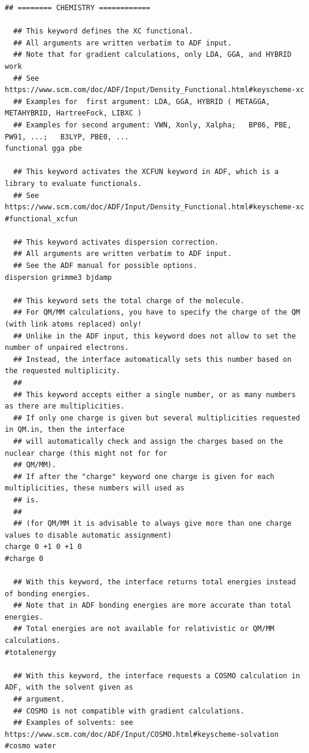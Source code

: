 \documentclass[a4paper,11pt,DIV=15,openany]{scrbook}
\begin{document}
\begin{oframed}
\begin{Verbatim}[commandchars=\\\{\}]
  ## ======== CHEMISTRY ============

  ## This keyword defines the XC functional.
  ## All arguments are written verbatim to ADF input.
  ## Note that for gradient calculations, only LDA, GGA, and HYBRID work
  ## See https://www.scm.com/doc/ADF/Input/Density_Functional.html#keyscheme-xc
  ## Examples for  first argument: LDA, GGA, HYBRID ( METAGGA, METAHYBRID, HartreeFock, LIBXC )
  ## Examples for second argument: VWN, Xonly, Xalpha;   BP86, PBE, PW91, ...;   B3LYP, PBE0, ...
functional gga pbe

  ## This keyword activates the XCFUN keyword in ADF, which is a library to evaluate functionals.
  ## See https://www.scm.com/doc/ADF/Input/Density_Functional.html#keyscheme-xc
#functional_xcfun

  ## This keyword activates dispersion correction.
  ## All arguments are written verbatim to ADF input.
  ## See the ADF manual for possible options.
dispersion grimme3 bjdamp

  ## This keyword sets the total charge of the molecule.
  ## For QM/MM calculations, you have to specify the charge of the QM (with link atoms replaced) only!
  ## Unlike in the ADF input, this keyword does not allow to set the number of unpaired electrons.
  ## Instead, the interface automatically sets this number based on the requested multiplicity.
  ##
  ## This keyword accepts either a single number, or as many numbers as there are multiplicities.
  ## If only one charge is given but several multiplicities requested in QM.in, then the interface
  ## will automatically check and assign the charges based on the nuclear charge (this might not for for 
  ## QM/MM).
  ## If after the "charge" keyword one charge is given for each multiplicities, these numbers will used as 
  ## is.
  ## 
  ## (for QM/MM it is advisable to always give more than one charge values to disable automatic assignment)
charge 0 +1 0 +1 0
#charge 0

  ## With this keyword, the interface returns total energies instead of bonding energies.
  ## Note that in ADF bonding energies are more accurate than total energies.
  ## Total energies are not available for relativistic or QM/MM calculations.
#totalenergy

  ## With this keyword, the interface requests a COSMO calculation in ADF, with the solvent given as 
  ## argument.
  ## COSMO is not compatible with gradient calculations.
  ## Examples of solvents: see https://www.scm.com/doc/ADF/Input/COSMO.html#keyscheme-solvation
#cosmo water


\end{Verbatim}
\end{oframed}
\end{document}
